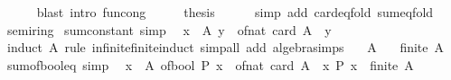 \begin{isabellebody}
\ \ \ \ \isamarkupfalse%
\ {\isacharparenleft}{\kern0pt}blast\ intro{\isacharcolon}{\kern0pt}\ fun{\isacharunderscore}{\kern0pt}cong{\isacharparenright}{\kern0pt}\isanewline
\ \ \isamarkupfalse%
\ \isamarkupfalse%
\ {\isacharquery}{\kern0pt}thesis\isanewline
\ \ \ \ \isamarkupfalse%
\ {\isacharparenleft}{\kern0pt}simp\ add{\isacharcolon}{\kern0pt}\ card{\isachardot}{\kern0pt}eq{\isacharunderscore}{\kern0pt}fold\ sum{\isachardot}{\kern0pt}eq{\isacharunderscore}{\kern0pt}fold{\isacharparenright}{\kern0pt}\isanewline
{}\isamarkupfalse%
%
\endisatagproof
{\isafoldproof}%
%
\isadelimproof
\isanewline
%
\endisadelimproof
\isanewline
{}\isamarkupfalse%
\ semiring{\isacharunderscore}{\kern0pt}{}\isanewline
{}\isanewline
\isanewline
{}\isamarkupfalse%
\ sum{\isacharunderscore}{\kern0pt}constant\ {\isacharbrackleft}{\kern0pt}simp{\isacharbrackright}{\kern0pt}{\isacharcolon}{\kern0pt}\isanewline
\ \ {\isachardoublequoteopen}{\isacharparenleft}{\kern0pt}{\isasymSum}x\ {\isasymin}\ A{\isachardot}{\kern0pt}\ y{\isacharparenright}{\kern0pt}\ {\isacharequal}{\kern0pt}\ of{\isacharunderscore}{\kern0pt}nat\ {\isacharparenleft}{\kern0pt}card\ A{\isacharparenright}{\kern0pt}\ {\isacharasterisk}{\kern0pt}\ y{\isachardoublequoteclose}\isanewline
%
\isadelimproof
\ \ %
\endisadelimproof
%
\isatagproof
{}\isamarkupfalse%
\ {\isacharparenleft}{\kern0pt}induct\ A\ rule{\isacharcolon}{\kern0pt}\ infinite{\isacharunderscore}{\kern0pt}finite{\isacharunderscore}{\kern0pt}induct{\isacharparenright}{\kern0pt}\ {\isacharparenleft}{\kern0pt}simp{\isacharunderscore}{\kern0pt}all\ add{\isacharcolon}{\kern0pt}\ algebra{\isacharunderscore}{\kern0pt}simps{\isacharparenright}{\kern0pt}%
\endisatagproof
{\isafoldproof}%
%
\isadelimproof
\isanewline
%
\endisadelimproof
\isanewline
{}\isamarkupfalse%
\isanewline
\ \ \ A\isanewline
\ \ \ {\isacartoucheopen}finite\ A{\isacartoucheclose}\isanewline
{}\isanewline
\isanewline
{}\isamarkupfalse%
\ sum{\isacharunderscore}{\kern0pt}of{\isacharunderscore}{\kern0pt}bool{\isacharunderscore}{\kern0pt}eq\ {\isacharbrackleft}{\kern0pt}simp{\isacharbrackright}{\kern0pt}{\isacharcolon}{\kern0pt}\isanewline
\ \ {\isacartoucheopen}{\isacharparenleft}{\kern0pt}{\isasymSum}x\ {\isasymin}\ A{\isachardot}{\kern0pt}\ of{\isacharunderscore}{\kern0pt}bool\ {\isacharparenleft}{\kern0pt}P\ x{\isacharparenright}{\kern0pt}{\isacharparenright}{\kern0pt}\ {\isacharequal}{\kern0pt}\ of{\isacharunderscore}{\kern0pt}nat\ {\isacharparenleft}{\kern0pt}card\ {\isacharparenleft}{\kern0pt}A\ {\isasyminter}\ {\isacharbraceleft}{\kern0pt}x{\isachardot}{\kern0pt}\ P\ x{\isacharbraceright}{\kern0pt}{\isacharparenright}{\kern0pt}{\isacharparenright}{\kern0pt}{\isacartoucheclose}\ \ {\isacartoucheopen}finite\ A{\isacartoucheclose}\isanewline

\end{isabellebody}
